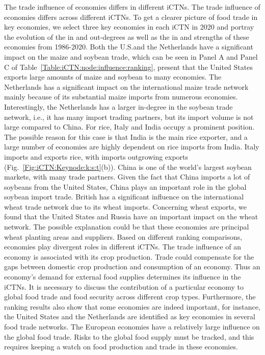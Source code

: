 \documentclass[preprint,3p,times,sort&compress]{elsarticle}
\begin{document}
The trade influence of economies differs in different iCTNs. The trade influence of economies differs across different iCTNs. To get a clearer picture of food trade in key economies, we select three key economies in each iCTN in 2020 and portray the evolution of the in and out-degrees as well as the in and strengths of these economies from 1986-2020. Both the U.S.and the Netherlands have a significant impact on the maize and soybean trade, which can be seen in Panel A and Panel C of Table~\ref{Table:iCTN:node:influence:ranking}, present that the United States exports large amounts of maize and soybean to many economies. The Netherlands has a significant impact on the international maize trade network mainly because of its substantial maize imports from numerous economies. Interestingly, the Netherlands has a larger in-degree in the soybean trade network, i.e., it has many import trading partners, but its import volume is not large compared to China. For rice, Italy and India occupy a prominent position. The possible reason for this case is that India is the main rice exporter, and a large number of economies are highly dependent on rice imports from India. Italy imports and exports rice, with imports outgrowing exports (Fig.~\ref{Fig:iCTN:Keynode:k:s:t}(b)). China is one of the world's largest soybean markets, with many trade partners. Given the fact that China imports a lot of soybeans from the United States, China plays an important role in the global soybean import trade. British has a significant influence on the international wheat trade network due to its wheat imports. Concerning wheat exports, we found that the United States and Russia have an important impact on the wheat network. The possible explanation could be that these economies are principal wheat planting areas and suppliers. Based on different ranking comparisons, economies play divergent roles in different iCTNs. The trade influence of an economy is associated with its crop production. Trade could compensate for the gaps between domestic crop production and consumption of an economy. Thus an economy's demand for external food supplies determines its influence in the iCTNs. It is necessary to discuss the contribution of a particular economy to global food trade and food security across different crop types. Furthermore, the ranking results also show that some economies are indeed important, for instance, the United States and the Netherlands are identified as key economies in several food trade networks. The European economies have a relatively large influence on the global food trade. Risks to the global food supply must be tracked, and this requires keeping a watch on food production and trade in these economies.
\end{document}
